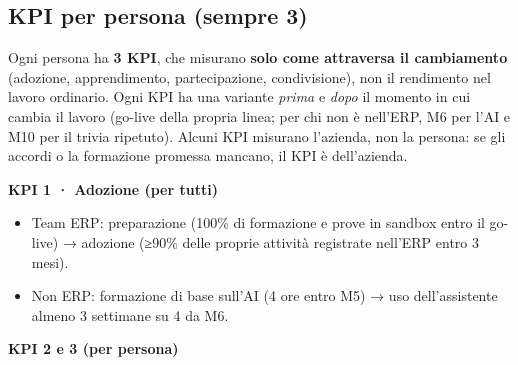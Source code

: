 \documentclass[11pt,a4paper]{article}
\begin{document}
\subsection{KPI per persona (sempre 3)}\label{sec:16.6}
Ogni persona ha \textbf{3 KPI}, che misurano \textbf{solo come attraversa il cambiamento} (adozione, apprendimento, partecipazione, condivisione), non il rendimento nel lavoro ordinario. Ogni KPI ha una variante \emph{prima} e \emph{dopo} il momento in cui cambia il lavoro (go-live della propria linea; per chi non è nell'ERP, M6 per l'AI e M10 per il trivia ripetuto). Alcuni KPI misurano l'azienda, non la persona: se gli accordi o la formazione promessa mancano, il KPI è dell'azienda.

\textbf{KPI 1 · Adozione (per tutti)}
\begin{itemize}
\item Team ERP: preparazione (100\% di formazione e prove in sandbox entro il go-live) → adozione (≥90\% delle proprie attività registrate nell'ERP entro 3 mesi).
\item Non ERP: formazione di base sull'AI (4 ore entro M5) → uso dell'assistente almeno 3 settimane su 4 da M6.
\end{itemize}

\textbf{KPI 2 e 3 (per persona)}
\end{document}
